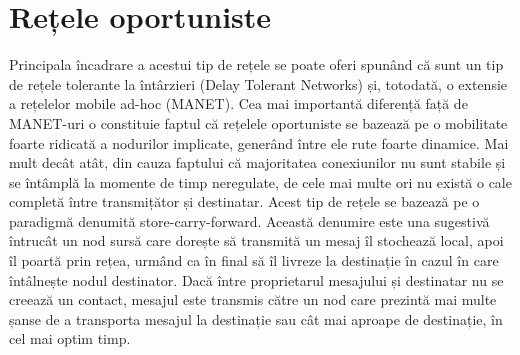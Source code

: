 \documentclass[12pt,a4paper]{report}
\begin{document}
\section{Rețele oportuniste} \label{reteleOportuniste}
Principala încadrare a acestui tip de rețele se poate oferi spunând că sunt un tip de rețele tolerante la întârzieri (Delay Tolerant Networks) și, totodată, o extensie a rețelelor mobile ad-hoc (MANET). Cea mai importantă diferență față de MANET-uri o constituie faptul că rețelele oportuniste se bazează pe o mobilitate foarte ridicată a nodurilor implicate, generând între ele rute foarte dinamice. Mai mult decât atât, din cauza faptului că majoritatea conexiunilor nu sunt stabile și se întâmplă la momente de timp neregulate, de cele mai multe ori nu există o cale completă între transmițător și destinatar. Acest tip de rețele se bazează pe o paradigmă denumită store-carry-forward. Această denumire este una sugestivă întrucât un nod sursă care dorește să transmită un mesaj îl stochează local, apoi îl poartă prin rețea, urmând ca în final să îl livreze la destinație în cazul în care întâlnește nodul destinator. Dacă între proprietarul mesajului și destinatar nu se creează un contact, mesajul este transmis către un nod care prezintă mai multe șanse de a transporta mesajul la destinație sau cât mai aproape de destinație, în cel mai optim timp.
\end{document}
